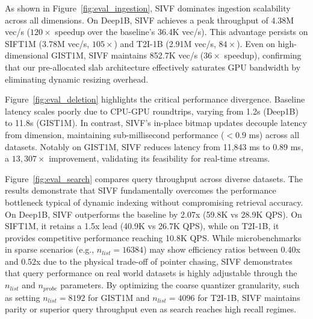 \documentclass[sigconf,nonacm]{acmart}
\theoremstyle{plain}
\theoremstyle{definition}
\theoremstyle{remark}
\begin{document}
As shown in Figure~\ref{fig:eval_ingestion}, SIVF dominates ingestion scalability across all dimensions. On Deep1B, SIVF achieves a peak throughput of 4.38M vec/s ($120\times$ speedup over the baseline's 36.4K vec/s). This advantage persists on SIFT1M (3.78M vec/s, $105\times$) and T2I-1B (2.91M vec/s, $84\times$). Even on high-dimensional GIST1M, SIVF maintains 852.7K vec/s ($36\times$ speedup), confirming that our pre-allocated slab architecture effectively saturates GPU bandwidth by eliminating dynamic resizing overhead.

Figure~\ref{fig:eval_deletion} highlights the critical performance divergence. Baseline latency scales poorly due to CPU-GPU roundtrips, varying from 1.2s (Deep1B) to 11.8s (GIST1M). In contrast, SIVF's in-place bitmap updates decouple latency from dimension, maintaining sub-millisecond performance ($<0.9$ ms) across all datasets. Notably on GIST1M, SIVF reduces latency from 11,843 ms to 0.89 ms, a $13,307\times$ improvement, validating its feasibility for real-time streams.

Figure~\ref{fig:eval_search} compares query throughput across diverse datasets. 
The results demonstrate that SIVF fundamentally overcomes the performance bottleneck typical of dynamic indexing without compromising retrieval accuracy. 
On Deep1B, SIVF outperforms the baseline by 2.07x (59.8K vs 28.9K QPS). 
On SIFT1M, it retains a 1.5x lead (40.9K vs 26.7K QPS), while on T2I-1B, it provides competitive performance reaching 10.8K QPS. 
While microbenchmarks in sparse scenarios (e.g., $n_{list}=16384$) may show efficiency ratios between 0.40x and 0.52x due to the physical trade-off of pointer chasing, SIVF demonstrates that query performance on real world datasets is highly adjustable through the $n_{list}$ and $n_{probe}$ parameters. 
By optimizing the coarse quantizer granularity, such as setting $n_{list}=8192$ for GIST1M and $n_{list}=4096$ for T2I-1B, SIVF maintains parity or superior query throughput even as search reaches high recall regimes. 
\end{document}
